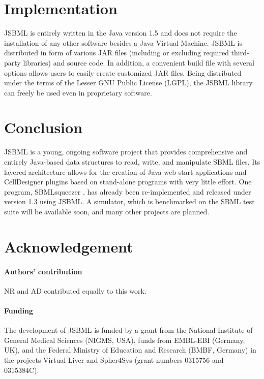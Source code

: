 \documentclass{bioinfo}
\begin{document}
\section{Implementation}

JSBML is entirely written in the Java\texttrademark{} version 1.5 and does
not require the installation of any other software besides a Java Virtual
Machine.
JSBML is distributed in form of various JAR files (including or excluding
required third-party libraries) and source code. In addition, a convenient build
file with several options allows users to easily create customized JAR files.
Being distributed under the terms of the Lesser GNU Public License (LGPL), the
JSBML library can freely be used even in proprietary software.



\section{Conclusion}

JSBML is a young, ongoing software project that provides comprehensive and
entirely Java-based data structures to read, write, and manipulate SBML files.
Its layered architecture allows for the creation of Java web start applications
and CellDesigner plugins based on stand-alone programs with very little effort.
%
One program, SBMLsqueezer \citep{Draeger2008}, has already been re-implemented
and released under version 1.3 using JSBML. A simulator, which is benchmarked
on the SBML test suite will be available soon, and many other projects are
planned.

\section*{Acknowledgement}

\paragraph{Authors' contribution\textcolon} NR and AD contributed equally to
this work.

\paragraph{Funding\textcolon}
The development of JSBML is funded by a grant from the National Institute of
General Medical Sciences (NIGMS, USA), funds from EMBL-EBI (Germany, UK), and
the Federal Ministry of Education and Research (BMBF, Germany) in the projects
Virtual Liver and Spher4Sys (grant numbers 0315756 and 0315384C).
\end{document}
